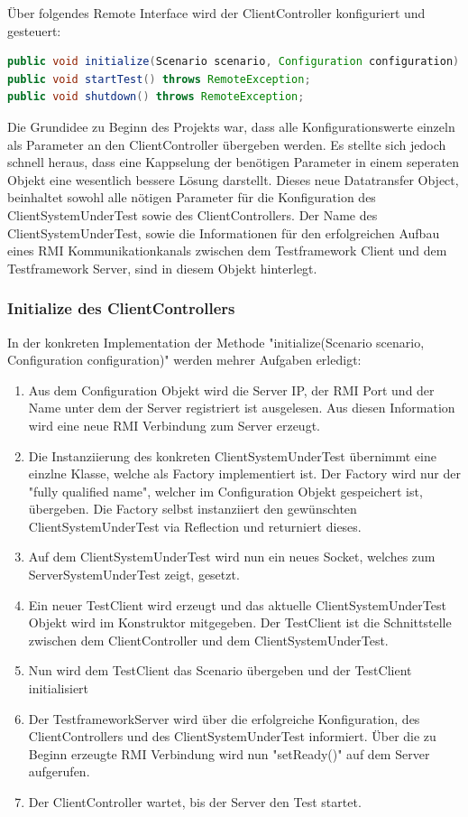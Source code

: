 Über folgendes Remote Interface wird der ClientController konfiguriert und gesteuert:
\begin{lstlisting}[language=java, breaklines=true] 	
public void initialize(Scenario scenario, Configuration configuration) throws RemoteException;
public void startTest() throws RemoteException;
public void shutdown() throws RemoteException;
\end{lstlisting}
Die Grundidee zu Beginn des Projekts war, dass alle Konfigurationswerte einzeln als Parameter an den ClientController übergeben werden. Es stellte sich jedoch schnell heraus, dass eine Kappselung der benötigen Parameter in einem seperaten Objekt eine wesentlich bessere Lösung darstellt. Dieses neue Datatransfer Object, beinhaltet sowohl alle nötigen Parameter für die Konfiguration des ClientSystemUnderTest sowie des ClientControllers. Der Name des ClientSystemUnderTest, sowie die Informationen für den erfolgreichen Aufbau eines RMI Kommunikationkanals zwischen dem Testframework Client und dem Testframework Server, sind in diesem Objekt hinterlegt.

\subsubsection{Initialize des ClientControllers}
In der konkreten Implementation der Methode "initialize(Scenario scenario, Configuration configuration)" werden mehrer Aufgaben erledigt:
\begin{enumerate}
\item Aus dem Configuration Objekt wird die Server IP, der RMI Port und der Name unter dem der Server registriert ist ausgelesen. Aus diesen Information wird eine neue RMI Verbindung zum Server erzeugt.
\item Die Instanziierung des konkreten ClientSystemUnderTest übernimmt eine einzlne Klasse, welche als Factory implementiert ist. Der Factory wird nur der "fully qualified name", welcher im Configuration Objekt gespeichert ist, übergeben. Die Factory selbst instanziiert den ge\-wünschten Client\-System\-Under\-Test via Re\-flec\-ti\-on und re\-turniert dieses.
\item Auf dem ClientSystemUnderTest wird nun ein neues Socket, welches zum ServerSystemUnderTest zeigt, gesetzt.
\item Ein neuer TestClient wird erzeugt und das aktuelle ClientSystemUnderTest Objekt wird im Konstruktor mitgegeben. Der TestClient ist die Schnittstelle zwischen dem ClientController und dem ClientSystemUnderTest.
\item Nun wird dem TestClient das Scenario übergeben und der TestClient initialisiert
\item Der TestframeworkServer wird über die erfolgreiche Konfiguration, des ClientControllers und des ClientSystemUnderTest informiert. Über die zu Beginn erzeugte RMI Verbindung wird nun "setReady()" auf dem Server aufgerufen.
\item Der ClientController wartet, bis der Server den Test startet.
\end{enumerate}

